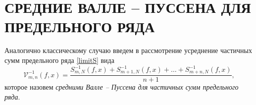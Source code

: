 \documentclass[12pt]{book}
\begin{document}





\section*{СРЕДНИЕ ВАЛЛЕ -- ПУССЕНА ДЛЯ ПРЕДЕЛЬНОГО РЯДА}

Аналогично классическому случаю введем в рассмотрение усреднение частичных сумм предельного ряда \eqref{limitS} вида
\begin{equation}\label{limitVP}
  \mathcal{V}^{-1}_{m,n}(f,x) = \frac{S_{m,N}^{-1}(f,x) + S_{m+1,N}^{-1}(f,x) + \ldots + S_{m+n,N}^{-1}(f,x)}{n+1},
\end{equation}
которое назовем \textit{средними Валле -- Пуссена для частичных сумм предельного ряда}.
\end{document}
